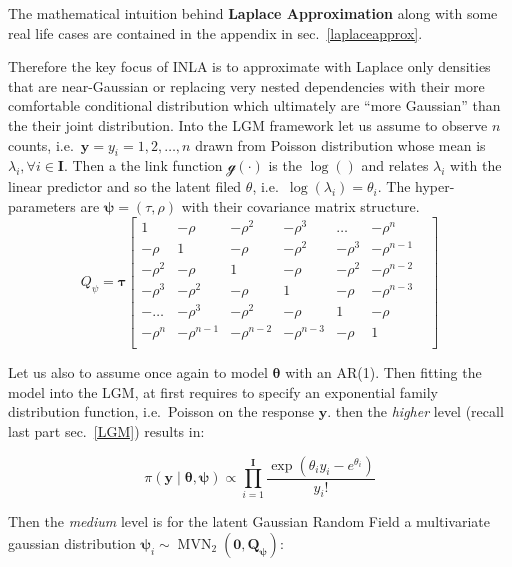 \documentclass[
  12pt,
  a4paper,
  oneside]{book}
\theoremstyle{definition}
\theoremstyle{definition}
\theoremstyle{definition}
\theoremstyle{remark}
\begin{document}
The mathematical intuition behind \textbf{Laplace Approximation} along with some real life cases are contained in the appendix in sec.~\ref{laplaceapprox}.

Therefore the key focus of INLA is to approximate with Laplace only densities that are near-Gaussian \citeyearpar{wang2018bayesian} or replacing very nested dependencies with their more comfortable conditional distribution which ultimately are ``more Gaussian'' than the their joint distribution.
Into the LGM framework let us assume to observe \(n\) counts, i.e.~\(\mathbf{y} = y_i = 1,2, \ldots, n\) drawn from Poisson distribution whose mean is \(\lambda_i, \forall i \in \mathbf{I}\). Then a the link function \(\mathscr{g}(\cdot)\) is the \(\log()\) and relates \(\lambda_i\) with the linear predictor and so the latent filed \(\theta\), i.e.~\(\log(\lambda_i)=\theta_{i}\). The hyper-parameters are \(\boldsymbol\psi = (\tau, \rho)\) with their covariance matrix structure.
\[
Q_{\psi}=\boldsymbol\tau\begin{bmatrix}
1 & - \rho & - \rho^{2} & - \rho^{3} & \ldots & - \rho^{n} &  \\
- \rho & 1 & - \rho & - \rho^{2} & - \rho^{3} & - \rho^{n-1} & \\
- \rho^{2} & - \rho & 1 & - \rho & - \rho^{2} & - \rho^{n-2} &  \\
- \rho^{3} & - \rho^{2} & - \rho & 1 & - \rho & - \rho^{n-3} &  \\
- \ldots & - \rho^{3} & - \rho^{2} & - \rho & 1 & - \rho &  \\
- \rho^{n} & - \rho^{n-1} & - \rho^{n-2} & - \rho^{n-3} & - \rho & 1 \\
\end{bmatrix}
\]

Let us also to assume once again to model \(\boldsymbol\theta\) with an AR(1).
Then fitting the model into the LGM, at first requires to specify an exponential family distribution function, i.e.~Poisson on the response \(\mathbf{y}\).
then the \emph{higher} level (recall last part sec.~\ref{LGM}) results in:

\[
\pi(\boldsymbol{\mathbf{y}} \mid \boldsymbol{\theta} , \boldsymbol{\psi}) \propto\prod_{i=1}^{\mathbf{I}} \frac{ \exp \left(\theta_{i} y_{i}-e^{\theta_{i}}\right) }{y_{i} !}
\]

Then the \emph{medium} level is for the latent Gaussian Random Field a multivariate gaussian distribution \(\boldsymbol{\psi}_{i} \sim \operatorname{MVN}_{2}(\mathbf{0}, \boldsymbol{Q}_{\boldsymbol{\psi}})\):
\end{document}
